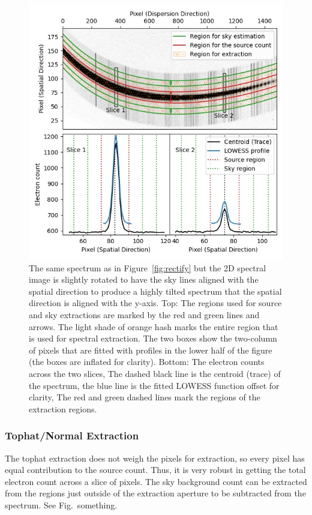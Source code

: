 \documentclass[fleqn,usenatbib]{mnras}
\begin{document}
\begin{figure}
    \centering
    \includegraphics[width=\columnwidth]{fig_03_extraction_profile.jpg}
    \caption{The same spectrum as in Figure~\ref{fig:rectify} but the
    2D spectral image is slightly rotated to have the sky lines
    aligned with the spatial direction to produce a highly tilted
    spectrum that the spatial direction is aligned with the y-axis.
    Top: The regions used for source and sky extractions are marked
    by the red and green lines and arrows. The light shade of orange
    hash marks the entire region that is used for spectral extraction.
    The two boxes show the two-column of pixels that are fitted with
    profiles in the lower half of the figure (the boxes are inflated
    for clarity). Bottom: The electron counts across the two slices,
    The dashed black line is the centroid (trace) of the spectrum,
    the blue line is the fitted LOWESS function offset for clarity,
    The red and green dashed lines mark the regions of the extraction
    regions.}
    \label{fig:extract}
\end{figure}

\subsubsection*{Tophat/Normal Extraction}
The tophat extraction does not weigh the pixels for extraction,
so every pixel has equal contribution to the source count. Thus,
it is very robust in getting the total electron count across
a slice of pixels. The sky background count can be extracted
from the regions just outside of the extraction aperture to be
subtracted from the spectrum. See Fig.~something.
\end{document}
